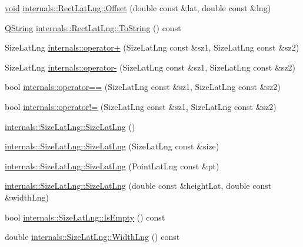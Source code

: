 \begin{DoxyCompactItemize}
\item 
\hyperlink{group___u_a_v_objects_plugin_ga444cf2ff3f0ecbe028adce838d373f5c}{void} \hyperlink{group___o_p_map_widget_ga1a10ea11e40912f56849b245a5811942}{internals\-::\-Rect\-Lat\-Lng\-::\-Offset} (double const \&lat, double const \&lng)
\item 
\hyperlink{group___u_a_v_objects_plugin_gab9d252f49c333c94a72f97ce3105a32d}{\-Q\-String} \hyperlink{group___o_p_map_widget_ga1772321726c6fc1fc073310fd4541b12}{internals\-::\-Rect\-Lat\-Lng\-::\-To\-String} () const 
\item 
\-Size\-Lat\-Lng \hyperlink{group___o_p_map_widget_ga40db61334553eb3b32aee299116e616a}{internals\-::operator+} (\-Size\-Lat\-Lng const \&sz1, \-Size\-Lat\-Lng const \&sz2)
\item 
\-Size\-Lat\-Lng \hyperlink{group___o_p_map_widget_gab6ce9f24cd5044e4c558c513bdb96efc}{internals\-::operator-\/} (\-Size\-Lat\-Lng const \&sz1, \-Size\-Lat\-Lng const \&sz2)
\item 
bool \hyperlink{group___o_p_map_widget_gad24bfed7e42c2af0ee0f764c6cc34611}{internals\-::operator==} (\-Size\-Lat\-Lng const \&sz1, \-Size\-Lat\-Lng const \&sz2)
\item 
bool \hyperlink{group___o_p_map_widget_gaa65f8008332c3773a009a9d307330a5d}{internals\-::operator!=} (\-Size\-Lat\-Lng const \&sz1, \-Size\-Lat\-Lng const \&sz2)
\item 
\hyperlink{group___o_p_map_widget_ga577f5727b9da5a209c90b8a1616d168c}{internals\-::\-Size\-Lat\-Lng\-::\-Size\-Lat\-Lng} ()
\item 
\hyperlink{group___o_p_map_widget_ga3981b48b207701daa66030fc596bfda2}{internals\-::\-Size\-Lat\-Lng\-::\-Size\-Lat\-Lng} (\-Size\-Lat\-Lng const \&size)
\item 
\hyperlink{group___o_p_map_widget_gaac692b4a2979e688baced1205991cf2a}{internals\-::\-Size\-Lat\-Lng\-::\-Size\-Lat\-Lng} (\-Point\-Lat\-Lng const \&pt)
\item 
\hyperlink{group___o_p_map_widget_ga1d7d8f77f50a09f416f4fd64170db374}{internals\-::\-Size\-Lat\-Lng\-::\-Size\-Lat\-Lng} (double const \&height\-Lat, double const \&width\-Lng)
\item 
bool \hyperlink{group___o_p_map_widget_ga33e0b9f4dd15b12e9a3053753a9d2335}{internals\-::\-Size\-Lat\-Lng\-::\-Is\-Empty} () const 
\item 
double \hyperlink{group___o_p_map_widget_ga4c692638cdb086a911d2bfc4a8d93f70}{internals\-::\-Size\-Lat\-Lng\-::\-Width\-Lng} () const 
\item 

\end{DoxyCompactItemize}
